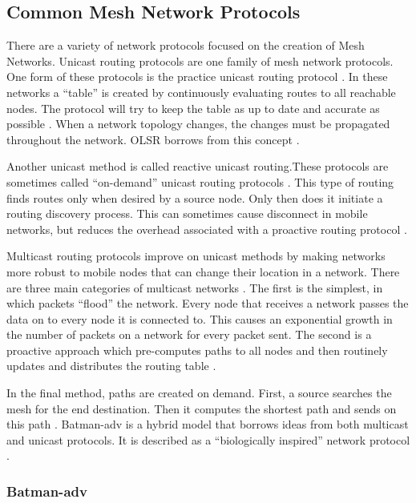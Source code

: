 \subsection{Common Mesh Network Protocols}

There are a variety of network protocols focused on the creation of Mesh Networks. Unicast routing protocols are one family of mesh network protocols. One form of these protocols is the practice unicast routing protocol \cite{4796928}. In these networks a ``table'' is created by continuously evaluating routes to all reachable nodes. The protocol will try to keep the table as up to date and accurate as possible \cite{4796928}. When a network topology changes, the changes must be propagated throughout the network. OLSR borrows from this concept \cite{0033} \cite{5375690}. 

Another unicast method is called reactive unicast routing.These protocols are sometimes called ``on-demand'' unicast routing protocols \cite{4796928}. This type of routing finds routes only when desired by a source node. Only then does it initiate a routing discovery process. This can sometimes cause disconnect in mobile networks, but reduces the overhead associated with a proactive routing protocol \cite{0033}.

Multicast routing protocols improve on unicast methods by making networks more robust to mobile nodes that can change their location in a network. There are three main categories of multicast networks \cite{4796928}. The first is the simplest, in which packets ``flood'' the network. Every node that receives a network passes the data on to every node it is connected to. This causes an exponential growth in the number of packets on a network for every packet sent. The second is a proactive approach which pre-computes paths to all nodes and then routinely updates and distributes the routing table \cite{4796928}.

In the final method, paths are created on demand. First, a source searches the mesh for the end destination. Then it computes the shortest path and sends on this path \cite{4796928}. Batman-adv is a hybrid model that borrows ideas from both multicast and unicast protocols. It is described as a ``biologically inspired'' network protocol \cite{0033}.  

\subsubsection{Batman-adv}

